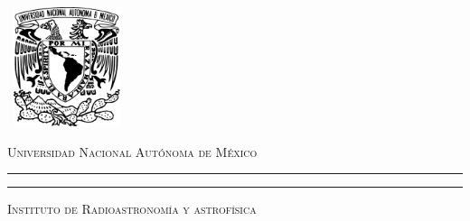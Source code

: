 \documentclass[letterpaper,12pt,oneside]{book}
\begin{document}

    \begin{titlepage}
        \thispagestyle{empty}
        \begin{minipage}[c][0.17\textheight][c]{0.25\textwidth}
            \begin{center}
                \includegraphics[width=3.5cm, height=3.5cm]{Escudo-UNAM.pdf}
            \end{center}
        \end{minipage}
        \begin{minipage}[c][0.195\textheight][t]{0.75\textwidth}
            \begin{center}
                \vspace{0.3cm}
                \textsc{\large Universidad Nacional Aut\'onoma de M\'exico}\\[0.5cm]
                \vspace{0.3cm}
                \hrule height2.5pt
                \vspace{.2cm}
                \hrule height1pt
                \vspace{.8cm}
                \textsc{Instituto de Radioastronomía y astrofísica}\\[0.5cm] %
            \end{center}
        \end{minipage}


\end{titlepage}
\end{document}

